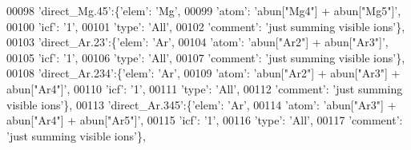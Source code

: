 \begin{DoxyCode}
00098                          \textcolor{stringliteral}{'direct\_Mg.45'}:\{\textcolor{stringliteral}{'elem'}: \textcolor{stringliteral}{'Mg'},
00099                                        \textcolor{stringliteral}{'atom'}: \textcolor{stringliteral}{'abun["Mg4"] + abun["Mg5"]'},
00100                                        \textcolor{stringliteral}{'icf'}: \textcolor{stringliteral}{'1'},
00101                                        \textcolor{stringliteral}{'type'}: \textcolor{stringliteral}{'All'},
00102                                        \textcolor{stringliteral}{'comment'}: \textcolor{stringliteral}{'just summing visible ions'}\},
00103                          \textcolor{stringliteral}{'direct\_Ar.23'}:\{\textcolor{stringliteral}{'elem'}: \textcolor{stringliteral}{'Ar'},
00104                                        \textcolor{stringliteral}{'atom'}: \textcolor{stringliteral}{'abun["Ar2"] + abun["Ar3"]'},
00105                                        \textcolor{stringliteral}{'icf'}: \textcolor{stringliteral}{'1'},
00106                                        \textcolor{stringliteral}{'type'}: \textcolor{stringliteral}{'All'},
00107                                        \textcolor{stringliteral}{'comment'}: \textcolor{stringliteral}{'just summing visible ions'}\},
00108                          \textcolor{stringliteral}{'direct\_Ar.234'}:\{\textcolor{stringliteral}{'elem'}: \textcolor{stringliteral}{'Ar'},
00109                                        \textcolor{stringliteral}{'atom'}: \textcolor{stringliteral}{'abun["Ar2"] + abun["Ar3"] + abun["Ar4"]'},
00110                                        \textcolor{stringliteral}{'icf'}: \textcolor{stringliteral}{'1'},
00111                                        \textcolor{stringliteral}{'type'}: \textcolor{stringliteral}{'All'},
00112                                        \textcolor{stringliteral}{'comment'}: \textcolor{stringliteral}{'just summing visible ions'}\},
00113                          \textcolor{stringliteral}{'direct\_Ar.345'}:\{\textcolor{stringliteral}{'elem'}: \textcolor{stringliteral}{'Ar'},
00114                                        \textcolor{stringliteral}{'atom'}: \textcolor{stringliteral}{'abun["Ar3"] + abun["Ar4"] + abun["Ar5"]'},
00115                                        \textcolor{stringliteral}{'icf'}: \textcolor{stringliteral}{'1'},
00116                                        \textcolor{stringliteral}{'type'}: \textcolor{stringliteral}{'All'},
00117                                        \textcolor{stringliteral}{'comment'}: \textcolor{stringliteral}{'just summing visible ions'}\},

\end{DoxyCode}
